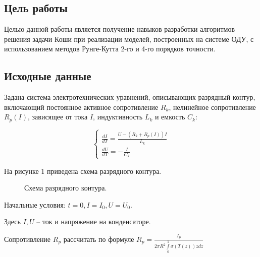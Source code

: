 \documentclass[a4paper,14pt]{article}
\begin{document}
\pgfplotsset{compat=1.17}


\subsection*{Цель работы}

Целью данной работы является получение навыков разработки  алгоритмов решения задачи Коши при реализации моделей, построенных на системе ОДУ, с использованием методов Рунге-Кутта 2-го и 4-го порядков точности.

\subsection*{Исходные данные}

Задана система электротехнических уравнений, описывающих разрядный контур, включающий постоянное активное сопротивление $R_k$, нелинейное сопротивление $R_p(I)$, зависящее от тока $I$, индуктивность $L_k$ и емкость $C_k$:

\begin{equation*}
 \begin{cases}
   \frac{dI}{dT} = \frac{U - (R_k + R_p(I))I}{L_k}\\
   \frac{dU}{dT} = -\frac{I}{C_k}
 \end{cases}
\end{equation*}

На рисунке 1 приведена схема разрядного контура.

\begin{figure}[!h]
\caption{Схема разрядного контура.}
\label{fig:image}
\end{figure}

Начальные условия: $t = 0, I = I_0, U = U_0$.

Здесь $I, U$ -- ток и напряжение на конденсаторе.

Сопротивление $R_p$ рассчитать по формуле $R_p = \frac{I_p}{2 \pi R^2 \int\limits_0^1 \sigma(T(z))zdz}$
\end{document}
